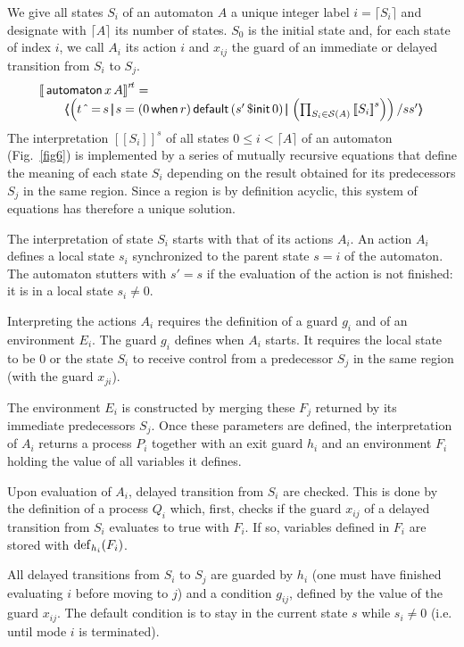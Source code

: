 \documentclass[copyright,creativecommons]{eptcs}
\renewcommand{\S}{{\cal{S}}}
\newcommand{\op}[1]{{\sf #1}}
\newcommand{\kw}[1]{{{\,\op{#1}\,}}}
\newcommand{\Pre}{\kw{\$ init}}
\newcommand{\Sync}{\kw{\mbox{$\hat{~}$}=}}
\newcommand{\Default}{\kw{default}}
\newcommand{\When}{\kw{when}}
\newcommand{\Par}{{\,|\!\!|\,}}
\newcommand{\Def}{{\rm{def}}}
\newcommand{\Sq}[1]{{[\![{#1}]\!]}}
\renewcommand{\:}{{:}}
\newcommand{\sq}[1]{\langle\!\!\langle{#1}\rangle\!\!\rangle}
\newcommand{\idx}[1]{\lceil{#1}\rceil}
\newcommand{\Auto}{{\kw{automaton}}}
\begin{document}
We give all states $S_i$ of an automaton $A$ a unique integer label $i=\idx{S_i}$ and designate with $\idx{A}$ its number of states. $S_0$ is the initial state and, for each state of index $i$, we call $A_i$ its action $i$ and $x_{ij}$ the guard of an immediate or delayed transition from $S_i$ to $S_j$.
\[
\begin{array}{l}
\Sq{\Auto x\,A}^{r\!t}=\\\qquad\sq{\left(
t\Sync s\Par s=(0\When r)\Default(s'\Pre 0)\Par
\left(\prod_{S_i\in \S(A)}\Sq{S_i}^{s}\right)\right)/ss'}
\end{array}
\]
The  interpretation $\Sq{S_i}^{s}$ of all states $0\leq i<\idx{A}$ of an automaton (Fig.~\ref{fig6}) is implemented by a series of mutually recursive equations that define the meaning of each state $S_i$ depending on the result obtained for its predecessors $S_j$ in the same region.  Since a region is by definition acyclic, this system of equations has therefore a unique solution.

The interpretation of state $S_i$ starts with that of its actions $A_i$. An action $A_i$ defines a local state $s_i$ synchronized to the parent state $s=i$ of the automaton. The automaton stutters with $s'=s$ if the evaluation of the action is not finished: it is in a local state $s_i\neq 0$. 

Interpreting the actions $A_i$ requires the definition of a guard $g_i$ and of an environment $E_i$. The guard $g_i$ defines when $A_i$ starts. It requires the local state to be $0$ or the state $S_i$ to receive control from a predecessor $S_j$ in the same region (with the guard $x_{ji}$).

The environment $E_i$ is constructed by merging these $F_j$ returned by its immediate predecessors $S_j$.  Once these parameters are defined, the interpretation of $A_i$ returns a process $P_i$ together with an exit guard $h_i$ and an environment $F_i$ holding the value of all variables it defines.

Upon evaluation of $A_i$, delayed transition from $S_i$ are checked.  This is done by the definition of a process $Q_i$ which, first, checks if the guard $x_{ij}$ of a delayed transition from $S_i$ evaluates to true with $F_i$.  If so, variables defined in $F_i$ are stored with $\Def_{h_i}(F_i)$.

All delayed transitions from $S_i$ to $S_j$ are guarded by $h_i$ (one must have finished evaluating $i$ before moving to $j$) and a condition $g_{ij}$, defined by the value of the guard $x_{ij}$.  The default condition is to stay in the current state $s$ while $s_i\neq 0$ (i.e. until mode $i$ is terminated). 
\end{document}
